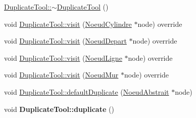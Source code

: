 \begin{DoxyCompactItemize}
\item 
\hyperlink{group__inf2990_gaab141bc62b424e5e0bfc48bd899bcb8a}{Duplicate\+Tool\+::$\sim$\+Duplicate\+Tool} ()
\item 
void \hyperlink{group__inf2990_gab91de27487440694048c1a0fbcc74da7}{Duplicate\+Tool\+::visit} (\hyperlink{class_noeud_cylindre}{Noeud\+Cylindre} $\ast$node) override
\item 
void \hyperlink{group__inf2990_ga5fa8bbf01a90c95062c8104ebdf5bb62}{Duplicate\+Tool\+::visit} (\hyperlink{class_noeud_depart}{Noeud\+Depart} $\ast$node) override
\item 
void \hyperlink{group__inf2990_ga73745cfc31434fbac0697d54aad3f571}{Duplicate\+Tool\+::visit} (\hyperlink{class_noeud_ligne}{Noeud\+Ligne} $\ast$node) override
\item 
void \hyperlink{group__inf2990_ga9b9e4456490e59603f3d8924fdf19c18}{Duplicate\+Tool\+::visit} (\hyperlink{class_noeud_mur}{Noeud\+Mur} $\ast$node) override
\item 
void \hyperlink{group__inf2990_ga4708caab32b10170d24dba25d4829677}{Duplicate\+Tool\+::default\+Duplicate} (\hyperlink{class_noeud_abstrait}{Noeud\+Abstrait} $\ast$node)
\item 
\hypertarget{group__inf2990_gadbe76417e934ddabc6df18141162fe2c}{}void {\bfseries Duplicate\+Tool\+::duplicate} ()\label{group__inf2990_gadbe76417e934ddabc6df18141162fe2c}


\end{DoxyCompactItemize}
